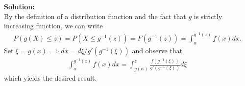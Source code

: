 \documentclass[12pt]{article}
\begin{document}
    \textbf{Solution:}\\
    By the definition of a distribution function and the fact that $g$ is strictly increasing function, we can write
    \begin{align}
        P(g(X) \leq z) = P(X \leq g^{-1}(z)) = F(g^{-1}(z)) = \int_{\alpha}^{g^{-1}(z)}f(x)dx.
    \end{align}
    Set $\xi = g(x)\implies dx = d\xi/g'(g^{-1}(\xi))$ and observe that 
    \begin{align}
        \int_{\alpha}^{g^{-1}(z)}f(x)dx = \int_{g(\alpha)}^z\frac{f(g^{-1}(\xi))}{g'(g^{-1}(\xi))}d\xi
    \end{align}
    which yields the desired result.
\end{document}
